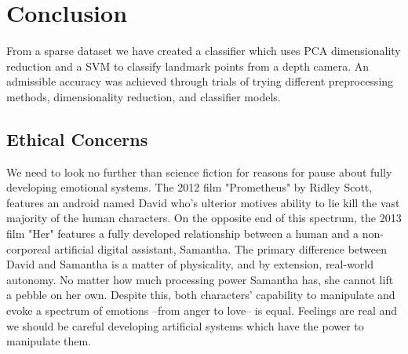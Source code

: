 \section{Conclusion}

From a sparse dataset we have created a classifier which uses PCA dimensionality reduction and a SVM to classify landmark points from a depth camera. An admissible accuracy was achieved through trials of trying different preprocessing methods, dimensionality reduction, and classifier models.

\subsection{Ethical Concerns}
We need to look no further than science fiction for reasons for pause about fully developing emotional systems. The 2012 film "Prometheus" by Ridley Scott, features an android named David who's ulterior motives ability to lie kill the vast majority of the human characters. On the opposite end of this spectrum, the 2013 film "Her" features a fully developed relationship between a human and a non-corporeal artificial digital assistant, Samantha. The primary difference between David and Samantha is a matter of physicality, and by extension, real-world autonomy. No matter how much processing power Samantha has, she cannot lift a pebble on her own. Despite this, both characters' capability to manipulate and evoke a spectrum of emotions --from anger to love-- is equal. Feelings are real and we should be careful developing artificial systems which have the power to manipulate them.
